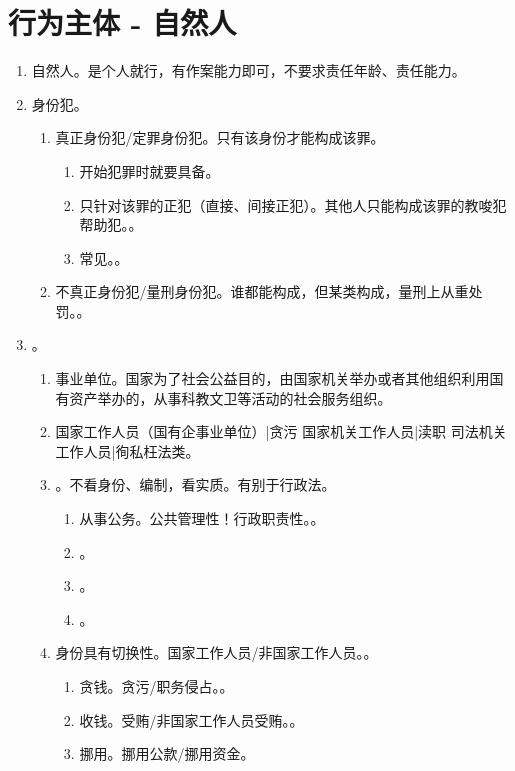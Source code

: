 \section{行为主体 - 自然人}
\begin{enumerate}
  \item 自然人。是个人就行，有作案能力即可，不要求责任年龄、责任能力。
  \item 身份犯。
        \begin{enumerate}
          \item 真正身份犯/定罪身份犯。只有该身份才能构成该罪。
                \begin{enumerate}
                  \item 开始犯罪时就要具备。
                  \item 只针对该罪的正犯（直接、间接正犯）。其他人只能构成该罪的教唆犯 \hz 帮助犯。。
                  \item 常见。。
                \end{enumerate}
          \item 不真正身份犯/量刑身份犯。谁都能构成，但某类构成，量刑上从重处罚。。
        \end{enumerate}
  \item {}。
        \begin{enumerate}
          \item 事业单位。国家为了社会公益目的，由国家机关举办或者其他组织利用国有资产举办的，从事科教文卫等活动的社会服务组织。
          \item 国家工作人员（国有企事业单位）|贪污 \dy 国家机关工作人员|渎职 \dy 司法机关工作人员|徇私枉法类。
          \item {}。不看身份、编制，看实质。有别于行政法。
                \begin{enumerate}
                  \item 从事公务。公共管理性！行政职责性。。
                  \item {}。
                  \item {}。
                  \item {}。
                \end{enumerate}
          \item 身份具有切换性。国家工作人员/非国家工作人员。。
                \begin{enumerate}
                  \item 贪钱。贪污/职务侵占。。
                  \item 收钱。受贿/非国家工作人员受贿。。
                  \item 挪用。挪用公款/挪用资金。
                \end{enumerate}
        \end{enumerate}
\end{enumerate}
